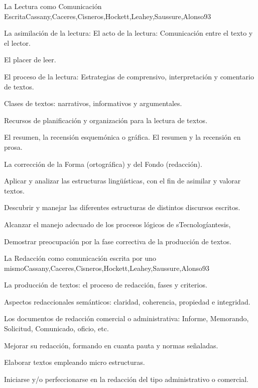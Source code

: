 \begin{syllabus}
\begin{unit}{La Lectura como Comunicación Escrita}{Cassany,Caceres,Cisneros,Hockett,Leahey,Saussure,Alonso}{9}{3}
\begin{topics}
   \item La asimilación de la lectura: El acto de la lectura: Comunicación entre el texto y el lector. 
   \item El placer de leer.  
   \item El proceso de la lectura: Estrategias de comprensivo, interpretación y comentario de textos.
   \item Clases de textos: narrativos, informativos y argumentales. 
   \item Recursos de planificación y organización para la lectura de textos.
   \item El resumen, la recensión esquemónica o gráfica. El resumen y la recensión en prosa.
   \item La corrección de la Forma (ortográfica) y del Fondo (redacción).
\end{topics}
\begin{unitgoals}
   \item Aplicar y analizar las estructuras lingüísticas, con el fin de asimilar y valorar textos.
   \item Descubrir y manejar las diferentes estructuras de distintos discursos escritos.
   \item Alcanzar el manejo adecuado de los procesos lógicos de sTecnologíantesis,
   \item Demostrar preocupación por la fase correctiva de la producción de textos.
\end{unitgoals}
\end{unit}

\begin{unit}{La Redacción como comunicación escrita por uno mismo}{Cassany,Caceres,Cisneros,Hockett,Leahey,Saussure,Alonso}{9}{3}
\begin{topics}
   \item La producción de textos: el proceso de redacción, fases y criterios.
   \item Aspectos redaccionales semánticos: claridad, coherencia, propiedad e integridad.
   \item Los documentos de redacción comercial o administrativa: Informe, Memorando, Solicitud, Comunicado, oficio, etc.
\end{topics}
\begin{unitgoals}
   \item Mejorar su redacción, formando en cuanta pauta y normas señaladas.
   \item Elaborar textos empleando micro estructuras.
   \item Iniciarse y/o perfeccionarse en la redacción del tipo administrativo o comercial.
\end{unitgoals}
\end{unit}


\end{syllabus}
